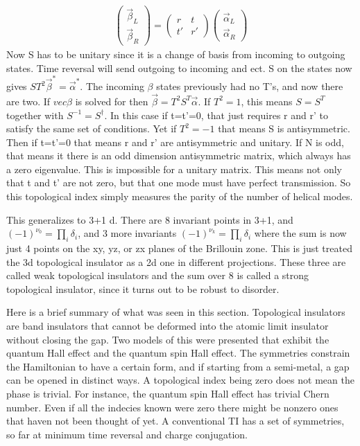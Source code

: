 \begin{align}
\begin{pmatrix}
\vec{\beta}_L \\
\vec{\beta}_R
\end{pmatrix}
=
\begin{pmatrix}
r & t\\
t' & r'
\end{pmatrix}
\begin{pmatrix}
\vec{\alpha}_L \\
\vec{\alpha}_R
\end{pmatrix}
\end{align}
Now S has to be unitary since it is a change of basis from incoming to outgoing states. Time reversal will send outgoing to incoming and ect. S on the states now gives $ST^2\vec{\beta}^*=\vec{\alpha}^*$. The incoming $\beta$ states previously had no T's, and now there are two. If $vec{\beta}$ is solved for then $\vec{\beta}=T^2S^T\vec{\alpha}$. If $T^2=1$, this means $S=S^T$ together with $S^{-1}=S^\dag$. In this case if t=t'=0, that just requires r and r' to satisfy the same set of conditions. Yet if $T^2=-1$ that means S is antisymmetric. Then if t=t'=0 that means r and r' are antisymmetric and unitary. If N is odd, that means it there is an odd dimension antisymmetric matrix, which always has a zero eigenvalue. This is impossible for a unitary matrix. This means not only that t and t' are not zero, but that one mode must have perfect transmission. So this topological index simply measures the parity of the number of helical modes.

This generalizes to 3+1 d. There are 8 invariant points in 3+1, and $(-1)^{\nu_0} = \prod_i \delta_i$, and 3 more invariants $(-1)^{\nu_k} = \prod_i \delta_i$ where the sum is now just 4 points on the xy, yz, or zx planes of the Brillouin zone. This is just treated the 3d topological insulator as a 2d one in different projections. These three are called weak topological insulators and the sum over 8 is called a strong topological insulator, since it turns out to be robust to disorder.

Here is a brief summary of what was seen in this section. Topological insulators are band insulators that cannot be deformed into the atomic limit insulator without closing the gap. Two models of this were presented that exhibit the quantum Hall effect and the quantum spin Hall effect. The symmetries constrain the Hamiltonian to have a certain form, and if starting from a semi-metal, a gap can be opened in distinct ways. A topological index being zero does not mean the phase is trivial. For instance, the quantum spin Hall effect has trivial Chern number. Even if all the indecies known were zero there might be nonzero ones that haven not been thought of yet. A conventional TI has a set of symmetries, so far at minimum time reversal and charge conjugation.
 

